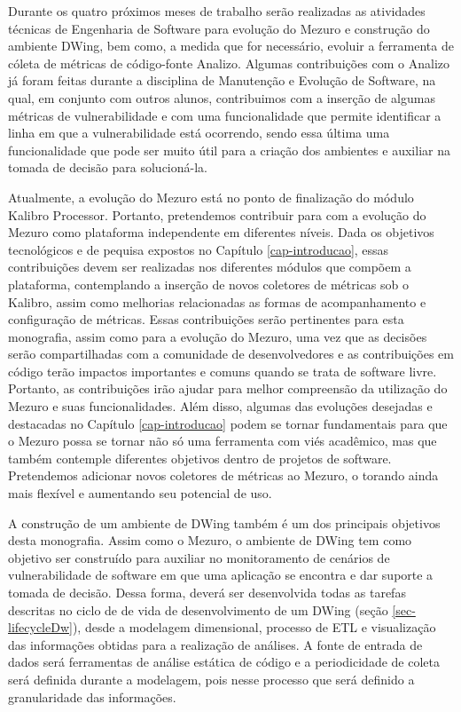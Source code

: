 Durante os quatro próximos meses de trabalho serão realizadas as atividades técnicas de Engenharia de Software para evolução do Mezuro e construção do ambiente DWing, bem como, a medida que for necessário, evoluir a ferramenta de cóleta de métricas de código-fonte Analizo. Algumas contribuições com o Analizo já foram feitas durante a disciplina de Manutenção e Evolução de Software, na qual, em conjunto com outros alunos, contribuimos com a inserção de algumas métricas de vulnerabilidade e com uma funcionalidade que permite identificar a linha em que a vulnerabilidade está ocorrendo, sendo essa última uma funcionalidade que pode ser muito útil para a criação dos ambientes e auxiliar na tomada de decisão para solucioná-la.

%

Atualmente, a evolução do Mezuro está no ponto de finalização do módulo Kalibro Processor. Portanto, pretendemos contribuir para com a evolução do Mezuro como plataforma independente em diferentes níveis. Dada os objetivos tecnológicos e de pequisa expostos no Capítulo \ref{cap-introducao}, essas contribuições devem ser realizadas nos diferentes módulos que compõem a plataforma, contemplando a inserção de novos coletores de métricas sob o Kalibro, assim como melhorias relacionadas as formas de acompanhamento e configuração de métricas. Essas contribuições serão pertinentes para esta monografia, assim como para a evolução do Mezuro, uma vez que as decisões serão compartilhadas com a comunidade de desenvolvedores e as contribuições em código terão impactos importantes e comuns quando se trata de software livre. Portanto, as contribuições irão ajudar para melhor compreensão da utilização do Mezuro e suas funcionalidades. Além disso, algumas das evoluções desejadas e destacadas no Capítulo \ref{cap-introducao} podem se tornar fundamentais para que o Mezuro possa se tornar não só uma ferramenta com viés acadêmico, mas que também contemple diferentes objetivos dentro de projetos de software. Pretendemos adicionar novos coletores de métricas ao Mezuro, o torando ainda mais flexível e aumentando seu potencial de uso.

%

A construção de um ambiente de DWing também é um dos principais objetivos desta monografia. Assim como o Mezuro, o ambiente de DWing tem como objetivo ser construído para auxiliar no monitoramento de cenários de vulnerabilidade de software em que uma aplicação se encontra e dar suporte a tomada de decisão. Dessa forma, deverá ser desenvolvida todas as tarefas descritas no ciclo de de vida de desenvolvimento de um DWing (seção \ref{sec-lifecycleDw}), desde a modelagem dimensional, processo de ETL e visualização das informações obtidas para a realização de análises. A fonte de entrada de dados será ferramentas de análise estática de código e a periodicidade de coleta será definida durante a modelagem, pois nesse processo que será definido a granularidade das informações.

